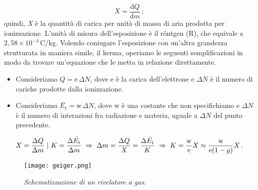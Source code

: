 \documentclass{report}
\numberwithin{equation}{section}
\numberwithin{figure}{section}
\begin{document}
\begin{equation}
    X = \frac{\mathrm{d}Q}{\mathrm{d}m}\,;
\end{equation}
quindi, \textit{X} è la quantità di carica per unità di massa di aria prodotta per ionizzazione. L'unità di misura dell'esposizione è il röntgen (R), che equivale a $2,58\times10^{-4}$\,C/kg. Volendo coniugare l'esposizione con un'altra grandezza strutturata in maniera simile, il kerma, operiamo le seguenti semplificazioni in modo da trovare un'equazione che le metta in relazione direttamente.
\begin{itemize}[label=$\triangleright$]
    \item Consideriamo $Q = \mathrm{e}\,\Delta N$, dove e è la carica dell'elettrone e $\Delta N$ è il numero di cariche prodotte dalla ionizzazione.
    \item Consideriamo $\bar{E_\mathrm{t}} = \mathrm{w}\,\Delta N$, dove w è una costante che non specifichiamo e $\Delta N$ è il numero di interazioni fra radiazione e materia, uguale a $\Delta N$ del punto precedente.
\end{itemize}
\begin{equation}
X = \frac{\Delta Q}{\Delta m}\hspace{3 pt} | \hspace{3 pt}K = \frac{\Delta \bar{E_\mathrm{t}}}{\Delta m}\hspace{3 pt} \Rightarrow \hspace{3 pt}\Delta m = \frac{\Delta Q}{X} = \frac{\Delta \bar{E_\mathrm{t}}}{K}\hspace{3 pt} \Rightarrow \hspace{3 pt}K = \frac{\mathrm{w}}{\mathrm{e}}X \approx \frac{\mathrm{w}}{\mathrm{e}(1-g)}X\,.
\end{equation}

\begin{figure}[htp]
\centering
\texttt{[image: geiger.png]}
\caption{\label{fig:geiger} \textit{Schematizzazione di un rivelatore a gas}.}
\end{figure}
\end{document}
